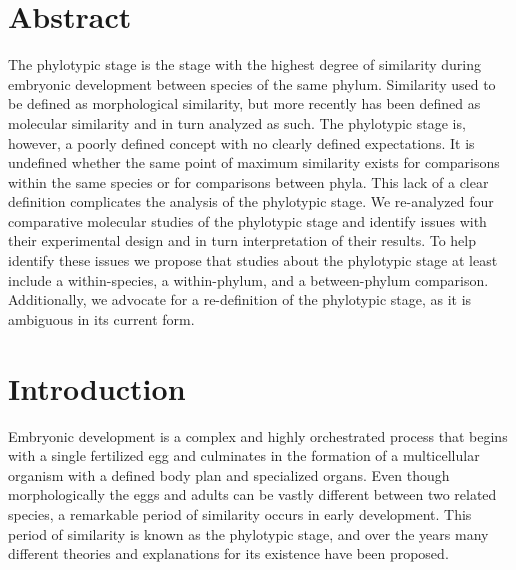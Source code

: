 \section{Abstract}

The phylotypic stage is the stage with the highest degree of similarity during embryonic development between species of the same phylum. Similarity used to be defined as morphological similarity, but more recently has been defined as molecular similarity and in turn analyzed as such. The phylotypic stage is, however, a poorly defined concept with no clearly defined expectations. It is undefined whether the same point of maximum similarity exists for comparisons within the same species or for comparisons between phyla. This lack of a clear definition complicates the analysis of the phylotypic stage. We re-analyzed four comparative molecular studies of the phylotypic stage and identify issues with their experimental design and in turn interpretation of their results. To help identify these issues we propose that studies about the phylotypic stage at least include a within-species, a within-phylum, and a between-phylum comparison. Additionally, we advocate for a re-definition of the phylotypic stage, as it is ambiguous in its current form.

\section{Introduction}

Embryonic development is a complex and highly orchestrated process that begins with a single fertilized egg and culminates in the formation of a multicellular organism with a defined body plan and specialized organs. Even though morphologically the eggs and adults can be vastly different between two related species, a remarkable period of similarity occurs in early development. This period of similarity is known as the phylotypic stage, and over the years many different theories and explanations for its existence have been proposed\cite{Kalinka2012,Irie2014,Drost2017}.  

